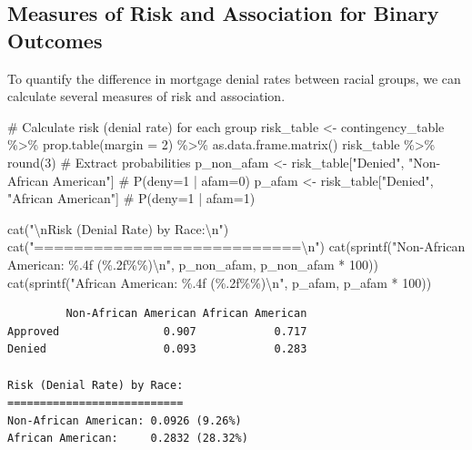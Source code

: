 \documentclass[
  12pt,
  letterpaper,
]{scrbook}
\newenvironment{Shaded}{\begin{snugshade}}{\end{snugshade}}
\newcommand{\AttributeTok}[1]{\textcolor[rgb]{0.40,0.45,0.13}{#1}}
\newcommand{\CommentTok}[1]{\textcolor[rgb]{0.37,0.37,0.37}{#1}}
\newcommand{\DecValTok}[1]{\textcolor[rgb]{0.68,0.00,0.00}{#1}}
\newcommand{\FunctionTok}[1]{\textcolor[rgb]{0.28,0.35,0.67}{#1}}
\newcommand{\NormalTok}[1]{\textcolor[rgb]{0.00,0.23,0.31}{#1}}
\newcommand{\OtherTok}[1]{\textcolor[rgb]{0.00,0.23,0.31}{#1}}
\newcommand{\SpecialCharTok}[1]{\textcolor[rgb]{0.37,0.37,0.37}{#1}}
\newcommand{\StringTok}[1]{\textcolor[rgb]{0.13,0.47,0.30}{#1}}
\theoremstyle{definition}
\theoremstyle{plain}
\theoremstyle{remark}
\begin{document}
\subsection{Measures of Risk and Association for Binary
Outcomes}\label{measures-of-risk-and-association-for-binary-outcomes}

To quantify the difference in mortgage denial rates between racial
groups, we can calculate several measures of risk and association.

\begin{Shaded}
\begin{Highlighting}[]
\CommentTok{\# Calculate risk (denial rate) for each group}
\NormalTok{risk\_table }\OtherTok{\textless{}{-}}\NormalTok{ contingency\_table }\SpecialCharTok{\%\textgreater{}\%}
    \FunctionTok{prop.table}\NormalTok{(}\AttributeTok{margin =} \DecValTok{2}\NormalTok{) }\SpecialCharTok{\%\textgreater{}\%}
    \FunctionTok{as.data.frame.matrix}\NormalTok{()}
\NormalTok{risk\_table }\SpecialCharTok{\%\textgreater{}\%} \FunctionTok{round}\NormalTok{(}\DecValTok{3}\NormalTok{)}
\CommentTok{\# Extract probabilities}
\NormalTok{p\_non\_afam }\OtherTok{\textless{}{-}}\NormalTok{ risk\_table[}\StringTok{"Denied"}\NormalTok{, }\StringTok{"Non{-}African American"}\NormalTok{] }\CommentTok{\# P(deny=1 | afam=0)}
\NormalTok{p\_afam }\OtherTok{\textless{}{-}}\NormalTok{ risk\_table[}\StringTok{"Denied"}\NormalTok{, }\StringTok{"African American"}\NormalTok{] }\CommentTok{\# P(deny=1 | afam=1)}

\FunctionTok{cat}\NormalTok{(}\StringTok{"}\SpecialCharTok{\textbackslash{}n}\StringTok{Risk (Denial Rate) by Race:}\SpecialCharTok{\textbackslash{}n}\StringTok{"}\NormalTok{)}
\FunctionTok{cat}\NormalTok{(}\StringTok{"===========================}\SpecialCharTok{\textbackslash{}n}\StringTok{"}\NormalTok{)}
\FunctionTok{cat}\NormalTok{(}\FunctionTok{sprintf}\NormalTok{(}\StringTok{"Non{-}African American: \%.4f (\%.2f\%\%)}\SpecialCharTok{\textbackslash{}n}\StringTok{"}\NormalTok{, p\_non\_afam, p\_non\_afam }\SpecialCharTok{*} \DecValTok{100}\NormalTok{))}
\FunctionTok{cat}\NormalTok{(}\FunctionTok{sprintf}\NormalTok{(}\StringTok{"African American:     \%.4f (\%.2f\%\%)}\SpecialCharTok{\textbackslash{}n}\StringTok{"}\NormalTok{, p\_afam, p\_afam }\SpecialCharTok{*} \DecValTok{100}\NormalTok{))}
\end{Highlighting}
\end{Shaded}

\begin{verbatim}
         Non-African American African American
Approved                0.907            0.717
Denied                  0.093            0.283

Risk (Denial Rate) by Race:
===========================
Non-African American: 0.0926 (9.26%)
African American:     0.2832 (28.32%)
\end{verbatim}
\end{document}
